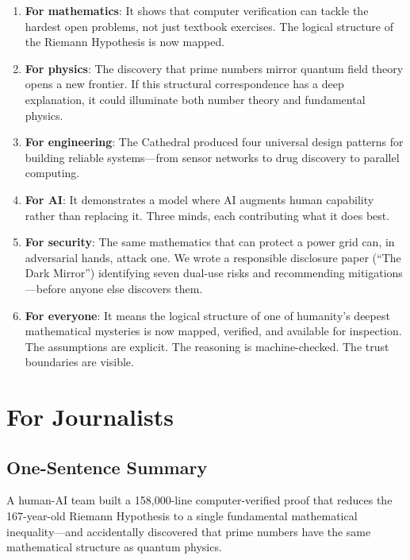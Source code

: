\documentclass[11pt,a4paper]{article}
\begin{document}
\begin{enumerate}
  \item \textbf{For mathematics}: It shows that computer verification
    can tackle the hardest open problems, not just textbook exercises.
    The logical structure of the Riemann Hypothesis is now mapped.

  \item \textbf{For physics}: The discovery that prime numbers mirror
    quantum field theory opens a new frontier. If this structural
    correspondence has a deep explanation, it could illuminate both
    number theory and fundamental physics.

  \item \textbf{For engineering}: The Cathedral produced four
    universal design patterns for building reliable systems---from
    sensor networks to drug discovery to parallel computing.

  \item \textbf{For AI}: It demonstrates a model where AI augments
    human capability rather than replacing it. Three minds, each
    contributing what it does best.

  \item \textbf{For security}: The same mathematics that can protect
    a power grid can, in adversarial hands, attack one. We wrote a
    responsible disclosure paper (``The Dark Mirror'') identifying
    seven dual-use risks and recommending mitigations---before
    anyone else discovers them.

  \item \textbf{For everyone}: It means the logical structure of one
    of humanity's deepest mathematical mysteries is now mapped,
    verified, and available for inspection. The assumptions are
    explicit. The reasoning is machine-checked. The trust
    boundaries are visible.
\end{enumerate}

\section{For Journalists}

\subsection{One-Sentence Summary}

A human-AI team built a 158{,}000-line computer-verified proof
that reduces the 167-year-old Riemann Hypothesis to a single
fundamental mathematical inequality---and accidentally discovered
that prime numbers have the same mathematical structure as
quantum physics.
\end{document}
